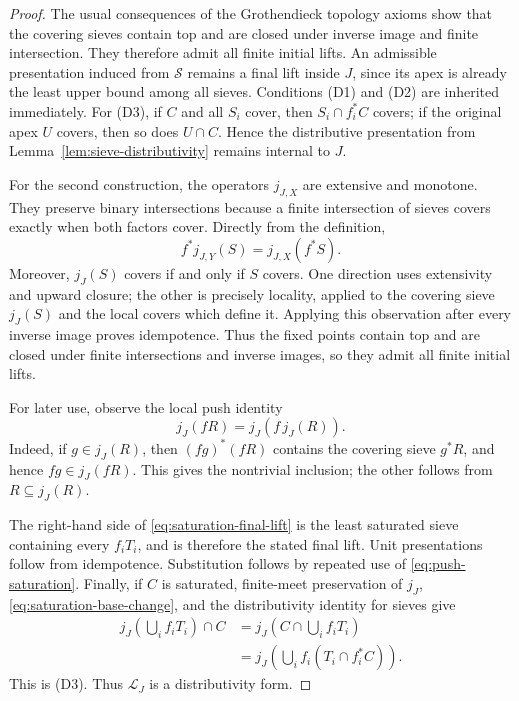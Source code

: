 \documentclass[12pt,oneside,reqno]{amsart}
\theoremstyle{definition}
\theoremstyle{remark}
\newcommand{\Sieve}{\mathscr S}
\newcommand{\Sat}{\mathscr L}
\begin{document}
\begin{proof}
The usual consequences of the Grothendieck topology axioms show that
the covering sieves contain top and are closed under inverse image and
finite intersection.  They therefore admit all finite initial lifts.
An admissible presentation induced from \(\Sieve\) remains a final lift
inside \(J\), since its apex is already the least upper bound among all
sieves.  Conditions (D1) and (D2) are inherited immediately.  For
(D3), if \(C\) and all \(S_i\) cover, then
\(S_i\cap f_i^*C\) covers; if the original apex \(U\) covers, then so
does \(U\cap C\).  Hence the distributive presentation from
Lemma~\ref{lem:sieve-distributivity} remains internal to \(J\).

For the second construction, the operators \(j_{J,X}\) are extensive
and monotone.  They preserve binary intersections because a finite
intersection of sieves covers exactly when both factors cover.  Directly
from the definition,
\begin{equation}\label{eq:saturation-base-change}
              f^*j_{J,Y}(S)=j_{J,X}(f^*S).
\end{equation}
Moreover, \(j_J(S)\) covers if and only if \(S\) covers.  One direction
uses extensivity and upward closure; the other is precisely locality,
applied to the covering sieve \(j_J(S)\) and the local covers which
define it.  Applying this observation after every inverse image proves
idempotence.  Thus the fixed points contain top and are closed under
finite intersections and inverse images, so they admit all finite
initial lifts.

For later use, observe the local push identity
\begin{equation}\label{eq:push-saturation}
                 j_J(fR)=j_J(f\,j_J(R)).
\end{equation}
Indeed, if \(g\in j_J(R)\), then \((fg)^*(fR)\) contains the covering
sieve \(g^*R\), and hence \(fg\in j_J(fR)\).  This gives the
nontrivial inclusion; the other follows from \(R\subseteq j_J(R)\).

The right-hand side of \eqref{eq:saturation-final-lift} is the least
saturated sieve containing every \(f_iT_i\), and is therefore the
stated final lift.  Unit presentations follow from idempotence.
Substitution follows by repeated use of \eqref{eq:push-saturation}.
Finally, if \(C\) is saturated, finite-meet preservation of \(j_J\),
\eqref{eq:saturation-base-change}, and the distributivity identity for
sieves give
\[
 \begin{aligned}
 j_J\!\left(\bigcup_i f_iT_i\right)\cap C
 &=j_J\!\left(C\cap\bigcup_i f_iT_i\right)\\
 &=j_J\!\left(\bigcup_i
       f_i(T_i\cap f_i^*C)\right).
 \end{aligned}
\]
This is (D3).  Thus \(\Sat_J\) is a distributivity form.


\end{proof}
\end{document}
